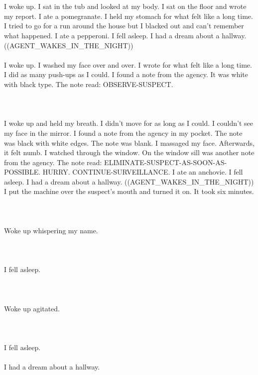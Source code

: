 \documentclass{article}
\begin{document}
    \section{}
    I woke up. I sat in the tub and looked at my body. I sat on the floor and wrote my report. I ate a pomegranate. I held my stomach for what felt like a long time. I tried to go for a run around the house but I blacked out and can't remember what happened. I ate a pepperoni. I fell asleep. I had a dream about a hallway. ((AGENT_WAKES_IN_THE_NIGHT)) \\\\I woke up. I washed my face over and over. I wrote for what felt like a long time. I did as many push-ups as I could. I found a note from the agency. It was white with black type. The note read: OBSERVE-SUSPECT. \\\\
    \newpage
    
    \section{}
    I woke up and held my breath. I didn't move for as long as I could. I couldn't see my face in the mirror. I found a note from the agency in my pocket. The note was black with white edges. The note was blank. I massaged my face. Afterwards, it felt numb. I watched through the window. On the window sill was another note from the agency. The note read: ELIMINATE-SUSPECT-AS-SOON-AS-POSSIBLE. HURRY. CONTINUE-SURVEILLANCE. I ate an anchovie. I fell asleep. I had a dream about a hallway. ((AGENT_WAKES_IN_THE_NIGHT)) I put the machine over the suspect's mouth and turned it on. It took six minutes. \\\\
    \newpage
    
    \section{}
    Woke up whispering my name.\\\\ 
    \newpage
    
    \section{}
    I fell asleep.\\\\ 
    \newpage
    
    \section{}
    Woke up agitated.\\\\ 
    \newpage
    
    \section{}
    I fell asleep.\\\\I had a dream about a hallway.\\\\ 
    \newpage
    
    
\end{document}

